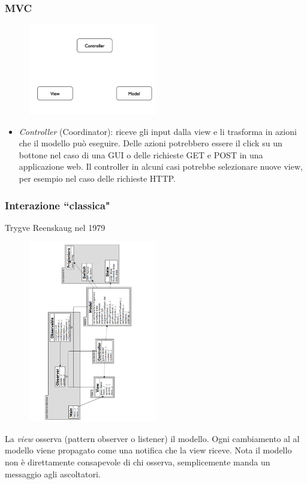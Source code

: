 \documentclass{beamer}
\begin{document}
\begin{frame}
\frametitle{MVC}
\begin{figure}
\centering
\includegraphics[width=0.5\textwidth]{Img/MVC1.pdf}
\end{figure}
\begin{itemize}
\item \emph{Controller} (Coordinator): riceve gli input dalla view e li trasforma in azioni che il modello pu\`o eseguire. Delle azioni potrebbero essere il click su un bottone nel caso di una GUI o delle richieste GET e POST in una applicazione web. Il controller in alcuni casi potrebbe selezionare nuove view, per esempio nel caso delle richieste HTTP.
\end{itemize}
\end{frame}


\begin{frame}
\frametitle{Interazione ``classica"}
Trygve Reenskaug nel 1979
\begin{figure}
\centering
\includegraphics[width=0.5\textwidth]{Img/MVC.pdf}
\end{figure}
 La \emph{view} osserva (pattern observer o listener) il modello. Ogni cambiamento al al modello viene propagato come una notifica che la view riceve. Nota il modello non \`e direttamente consapevole di chi osserva, semplicemente manda un messaggio agli ascoltatori.
\end{frame}
\end{document}
